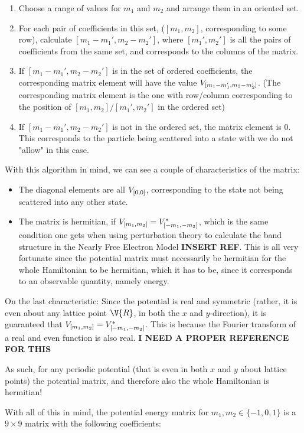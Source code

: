 \documentclass[main.tex]{subfiles}
\begin{document}
	\begin{enumerate}
		\item Choose a range of values for $ m_1 $ and $ m_2 $ and arrange them in an oriented set.
		\item For each pair of coefficients in this set, ($ [m_1, m_2] $, corresponding to some row), calculate $ [m_1-m_1', m_2-m_2'] $, where $ [m_1', m_2'] $ is all the pairs of coefficients from the same set, and corresponds to the columns of the matrix.
		\item If $ [m_1-m_1', m_2-m_2'] $ is in the set of ordered coefficients, the corresponding matrix element will have the value $ V_{[m_1-m_1', m_2-m_2']} $. (The corresponding matrix element is the one with row/column corresponding to the position of $ [m_1, m_2]/[m_1', m_2'] $ in the ordered set) 
		\item If $ [m_1-m_1', m_2-m_2'] $ is not in the ordered set, the matrix element is 0. This corresponds to the particle being scattered into a state with we do not "allow" in this case. 
	\end{enumerate}
	With this algorithm in mind, we can see a couple of characteristics of the matrix:
	\begin{itemize}
		\item The diagonal elements are all $ V_{[0,0]} $, corresponding to the state not being scattered into any other state.
		\item The matrix is hermitian, if $ V_{[m_1, m_2]} = V^*_{[-m_1, -m_2]}$, which is the same condition one gets when using perturbation theory to calculate the band structure in the Nearly Free Electron Model \textbf{INSERT REF}. This is all very fortunate since the potential matrix must necessarily be hermitian for the whole Hamiltonian to be hermitian, which it has to be, since it corresponds to an observable quantity, namely energy.
	\end{itemize}
	On the last characteristic: Since the potential is real and symmetric (rather, it is even about any lattice point $ \V{R} $, in both the $ x $ and $ y $-direction), it is guaranteed that $ V_{[m_1, m_2]} = V^*_{[-m_1, -m_2]}$. This is because the Fourier transform of a real and even function is also real. \textbf{I NEED A PROPER REFERENCE FOR THIS}
	
	As such, for any periodic potential (that is even in both $ x $ and $ y $ about lattice points) the potential matrix, and therefore also the whole Hamiltonian is hermitian!
	
	With all of this in mind, the potential energy matrix for $ m_1, m_2 \in \{-1, 0, 1\} $ is a $ 9 \times 9 $ matrix with the following coefficients:
	
\end{document}
